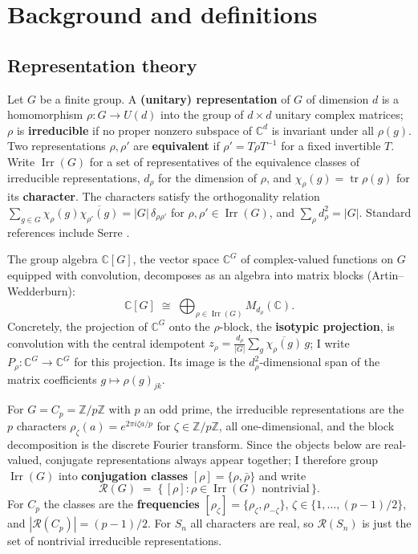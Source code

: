 \documentclass[11pt]{amsart}
\theoremstyle{plain}
\theoremstyle{definition}
\DeclareMathOperator{\Irr}{Irr}
\DeclareMathOperator{\tr}{tr}
\newcommand{\C}{\mathbb{C}}
\newcommand{\Z}{\mathbb{Z}}
\newcommand{\Rcl}{\mathcal{R}}
\begin{document}
\section{Background and definitions}\label{sec:background}

\subsection{Representation theory}\label{sec:reptheory}
Let $G$ be a finite group. A \textbf{(unitary) representation} of $G$ of dimension $d$ is a homomorphism $\rho \colon G \to U(d)$ into the group of $d \times d$ unitary complex matrices; $\rho$ is \textbf{irreducible} if no proper nonzero subspace of $\C^d$ is invariant under all $\rho(g)$. Two representations $\rho, \rho'$ are \textbf{equivalent} if $\rho' = T \rho T^{-1}$ for a fixed invertible $T$. Write $\Irr(G)$ for a set of representatives of the equivalence classes of irreducible representations, $d_\rho$ for the dimension of $\rho$, and $\chi_\rho(g) = \tr \rho(g)$ for its \textbf{character}. The characters satisfy the orthogonality relation $\sum_{g \in G} \chi_\rho(g) \overline{\chi_{\rho'}(g)} = |G|\,\delta_{\rho \rho'}$ for $\rho, \rho' \in \Irr(G)$, and $\sum_{\rho} d_\rho^2 = |G|$. Standard references include Serre \cite{serre1977}.

The group algebra $\C[G]$, the vector space $\C^G$ of complex-valued functions on $G$ equipped with convolution, decomposes as an algebra into matrix blocks (Artin--Wedderburn):
\[
   \C[G] \;\cong\; \bigoplus_{\rho \in \Irr(G)} M_{d_\rho}(\C).
\]
Concretely, the projection of $\C^G$ onto the $\rho$-block, the \textbf{isotypic projection}, is convolution with the central idempotent $z_\rho = \frac{d_\rho}{|G|} \sum_{g} \overline{\chi_\rho(g)}\, g$; I write $P_\rho \colon \C^G \to \C^G$ for this projection. Its image is the $d_\rho^2$-dimensional span of the matrix coefficients $g \mapsto \rho(g)_{jk}$.

For $G = C_p = \Z/p\Z$ with $p$ an odd prime, the irreducible representations are the $p$ characters $\rho_\zeta(a) = e^{2\pi i \zeta a / p}$ for $\zeta \in \Z/p\Z$, all one-dimensional, and the block decomposition is the discrete Fourier transform. Since the objects below are real-valued, conjugate representations always appear together; I therefore group $\Irr(G)$ into \textbf{conjugation classes} $[\rho] = \{\rho, \bar\rho\}$ and write
\[
   \Rcl(G) \;=\; \{\,[\rho] : \rho \in \Irr(G) \text{ nontrivial}\,\}.
\]
For $C_p$ the classes are the \textbf{frequencies} $[\rho_\zeta] = \{\rho_\zeta, \rho_{-\zeta}\}$, $\zeta \in \{1, \dots, (p-1)/2\}$, and $|\Rcl(C_p)| = (p-1)/2$. For $S_n$ all characters are real, so $\Rcl(S_n)$ is just the set of nontrivial irreducible representations.
\end{document}
